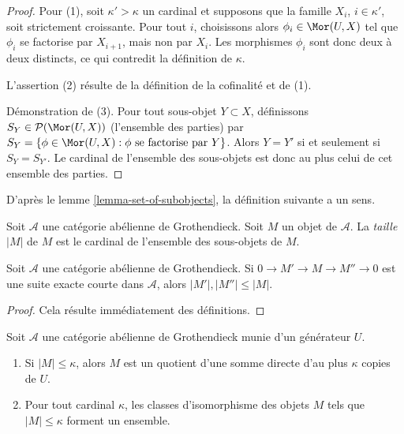 \begin{proof}
Pour (1), soit $\kappa' > \kappa$ un cardinal et supposons que
la famille $X_i$, $i \in \kappa'$, soit strictement croissante. Pour tout
$i$, choisissons alors $\phi_i \in \Mor(U, X)$ tel que $\phi_i$ se factorise
par $X_{i + 1}$, mais non par $X_i$. Les morphismes $\phi_i$ sont donc
deux à deux distincts, ce qui contredit la définition de $\kappa$.

\medskip\noindent
L'assertion (2) résulte de la définition de la cofinalité et de (1).

\medskip\noindent
Démonstration de (3). Pour tout sous-objet $Y \subset X$, définissons
$S_Y \in \mathcal{P}(\Mor(U, X))$ (l'ensemble des parties) par
$S_Y = \{\phi \in \Mor(U,X) : \phi\text{ se factorise par }Y\}$.
Alors $Y = Y'$ si et seulement si $S_Y = S_{Y'}$. Le cardinal de
l'ensemble des sous-objets est donc au plus celui de cet ensemble des parties.
\end{proof}

\noindent
D'après le lemme \ref{lemma-set-of-subobjects}, la définition suivante
a un sens.

\begin{definition}
\label{definition-size}
Soit $\mathcal{A}$ une catégorie abélienne de Grothendieck.
Soit $M$ un objet de $\mathcal{A}$.
La {\it taille} $|M|$ de $M$ est le cardinal de l'ensemble des sous-objets
de $M$.
\end{definition}

\begin{lemma}
\label{lemma-size-goes-down}
Soit $\mathcal{A}$ une catégorie abélienne de Grothendieck.
Si $0 \to M' \to M \to M'' \to 0$ est une suite exacte courte dans
$\mathcal{A}$, alors $|M'|, |M''| \leq |M|$.
\end{lemma}

\begin{proof}
Cela résulte immédiatement des définitions.
\end{proof}

\begin{lemma}
\label{lemma-set-iso-classes-bounded-size}
Soit $\mathcal{A}$ une catégorie abélienne de Grothendieck munie d'un
générateur $U$.
\begin{enumerate}
\item Si $|M| \leq \kappa$, alors $M$ est un quotient d'une somme directe
d'au plus $\kappa$ copies de $U$.
\item Pour tout cardinal $\kappa$, les classes d'isomorphisme des objets
$M$ tels que $|M| \leq \kappa$ forment un ensemble.
\end{enumerate}
\end{lemma}

